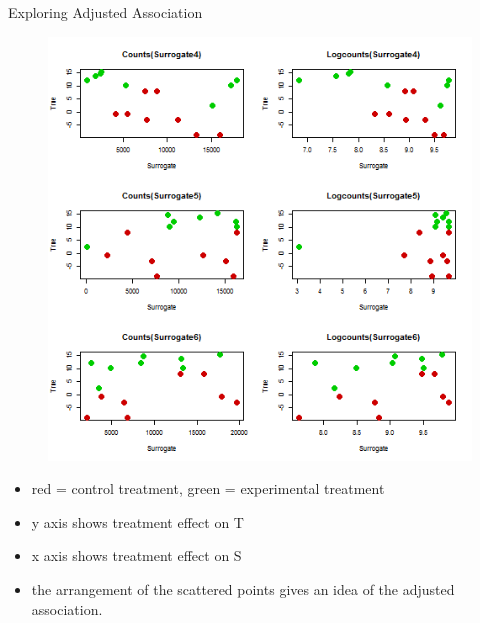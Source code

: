 \documentclass[a4paper,9pt]{beamer}\usepackage[]{graphicx}\usepackage[]{color}
\begin{document}
\begin{frame}{Exploring Adjusted Association}
\begin{minipage}{0.40\textwidth}
\begin{figure}[H]
\includegraphics[scale=0.3]{first_presentation-figure/exploration-2.png}
\end{figure}

\end{minipage}

\begin{itemize}
\item red = control treatment, green = experimental treatment
\item y axis shows treatment effect on T
\item x axis shows treatment effect on S
\item the arrangement of the scattered points gives an idea of the adjusted association.
\end{itemize}

\end{frame}
\end{document}
